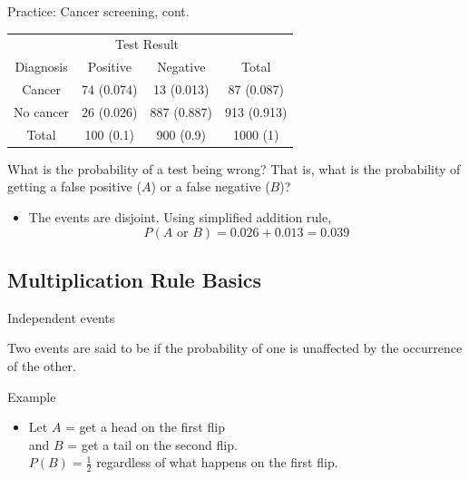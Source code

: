 \documentclass[xcolor=table]{beamer}
\begin{document}
\begin{frame}{Practice: Cancer screening, cont.}
\begin{block}{}
{\centering
\begin{tabular}{c | c  c | c}
\multicolumn{1}{c}{} & \multicolumn{2}{c}{Test Result}\\
Diagnosis & Positive & Negative & Total \\
\hline
Cancer & 74 (0.074) & 13 (0.013) & 87 (0.087)\\
No cancer & 26 (0.026) & 887 (0.887) & 913 (0.913)\\
\hline
Total & 100 (0.1) & 900 (0.9) & 1000 (1)
\end{tabular}\par
}
\end{block}

\begin{exampleblock}{}
What is the probability of a test being wrong? That is, what is the probability of getting a false positive ($A$) or a false negative ($B$)?

\begin{itemize}
\pause
\item The events are disjoint. Using simplified addition rule,
\[ P(A \text{ or } B) = 0.026 + 0.013 = 0.039\]
\end{itemize}
\end{exampleblock}
\end{frame}

\subsection{Multiplication Rule Basics}

\begin{frame}{Independent events}
\begin{block}{}
\large Two events are said to be  if the probability of one is unaffected by the occurrence of the other.
\end{block}

\pause

\begin{exampleblock}{Example}
\begin{itemize}
\item Let $A$ = get a head on the first flip\\
and $B$ = get a tail on the second flip.\\
$P(B) = \frac 1 2$ regardless of what happens on the first flip.
\end{itemize}
\end{exampleblock}
\end{frame}
\end{document}
